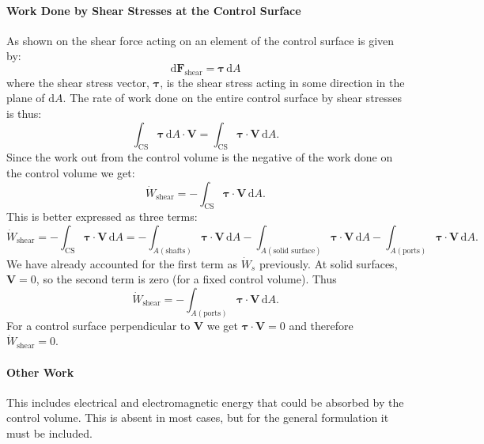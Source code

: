 \paragraph{Work Done by Shear Stresses at the Control Surface}
As shown on  the shear force acting on an element of the control surface is given by:
\[ 
\mathrm{d} \textbf{F}_{\mathrm{shear}} = \bm{\tau} \, \mathrm{d}A
\]
where the shear stress vector, $\bm{\tau}$, is the shear stress acting in some direction in the plane of $\mathrm{d}A$. The rate of work done on the entire control surface by shear stresses is thus:
\[ 
\int_{\mathrm{CS}} \bm{\tau} \, \mathrm{d}A \cdot \textbf{V} = \int_{\mathrm{CS}} \bm{\tau} \cdot \textbf{V} \, \mathrm{d}A
.\]
Since the work out from the control volume is the negative of the work done on the control volume we get:
\[ 
\dot{W}_{\mathrm{shear}} = - \int_{\mathrm{CS}} \bm{\tau} \cdot \textbf{V} \, \mathrm{d}A
.\]
This is better expressed as three terms:
\[ 
  \dot{W}_{\mathrm{shear}} = - \int_{\mathrm{CS}} \bm{\tau} \cdot \textbf{V} \, \mathrm{d}A = - \int_{A (\mathrm{shafts})} \bm{\tau} \cdot \textbf{V} \, \mathrm{d}A - \int_{A (\text{solid surface})} \bm{\tau} \cdot \textbf{V} \, \mathrm{d}A - \int_{A (\mathrm{ports})} \bm{\tau} \cdot \textbf{V} \, \mathrm{d}A 
.\]
We have already accounted for the first term as $\dot{W}_s$ previously. At solid surfaces, $\textbf{V} = 0$, so the second term is zero (for a fixed control volume). Thus
\[ 
\dot{W}_{\mathrm{shear}} = - \int_{A (\mathrm{ports})} \bm{\tau} \cdot \textbf{V} \, \mathrm{d}A
.\]
For a control surface perpendicular to $\textbf{V}$ we get $\bm{\tau} \cdot \textbf{V} = 0$ and therefore $\dot{W}_{\mathrm{shear}} = 0$. 

\paragraph{Other Work}
This includes electrical and electromagnetic energy that could be absorbed by the control volume. This is absent in most cases, but for the general formulation it must be included.

